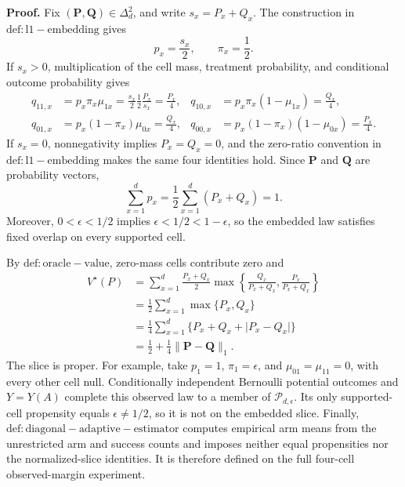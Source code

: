 \textbf{Proof.}
Fix \((\mathbf P,\mathbf Q)\in\Delta_d^2\), and write \(s_x=P_x+Q_x\).  The construction in \(\mathrm{def:l1-embedding}\) gives
\[
 p_x=\frac{s_x}{2},\qquad \pi_x=\frac12.
\]
If \(s_x>0\), multiplication of the cell mass, treatment probability, and conditional outcome probability gives
\[
 \begin{aligned}
 q_{11,x}&=p_x\pi_x\mu_{1x}
 =\frac{s_x}{2}\frac12\frac{P_x}{s_x}=\frac{P_x}{4},
 &q_{10,x}&=p_x\pi_x(1-\mu_{1x})=\frac{Q_x}{4},\\
 q_{01,x}&=p_x(1-\pi_x)\mu_{0x}=\frac{Q_x}{4},
 &q_{00,x}&=p_x(1-\pi_x)(1-\mu_{0x})=\frac{P_x}{4}.
 \end{aligned}
\]
If \(s_x=0\), nonnegativity implies \(P_x=Q_x=0\), and the zero-ratio convention in \(\mathrm{def:l1-embedding}\) makes the same four identities hold.  Since \(\mathbf P\) and \(\mathbf Q\) are probability vectors,
\[
 \sum_{x=1}^d p_x
 =\frac12\sum_{x=1}^d(P_x+Q_x)=1.
\]
Moreover, \(0<\epsilon<1/2\) implies \(\epsilon<1/2<1-\epsilon\), so the embedded law satisfies fixed overlap on every supported cell.

By \(\mathrm{def:oracle-value}\), zero-mass cells contribute zero and
\[
 \begin{aligned}
 V^\star(P)
 &=\sum_{x=1}^d \frac{P_x+Q_x}{2}
   \max\!\left\{\frac{Q_x}{P_x+Q_x},
                    \frac{P_x}{P_x+Q_x}\right\}\\
 &=\frac12\sum_{x=1}^d\max\{P_x,Q_x\}\\
 &=\frac14\sum_{x=1}^d
   \{P_x+Q_x+\lvert P_x-Q_x\rvert\}\\
 &=\frac12+\frac14\lVert\mathbf P-\mathbf Q\rVert_1.
 \end{aligned}
\]
The slice is proper.  For example, take \(p_1=1\), \(\pi_1=\epsilon\), and \(\mu_{01}=\mu_{11}=0\), with every other cell null.  Conditionally independent Bernoulli potential outcomes and \(Y=Y(A)\) complete this observed law to a member of \(\mathcal P_{d,\epsilon}\).  Its only supported-cell propensity equals \(\epsilon\ne1/2\), so it is not on the embedded slice.  Finally, \(\mathrm{def:diagonal-adaptive-estimator}\) computes empirical arm means from the unrestricted arm and success counts and imposes neither equal propensities nor the normalized-slice identities.  It is therefore defined on the full four-cell observed-margin experiment.